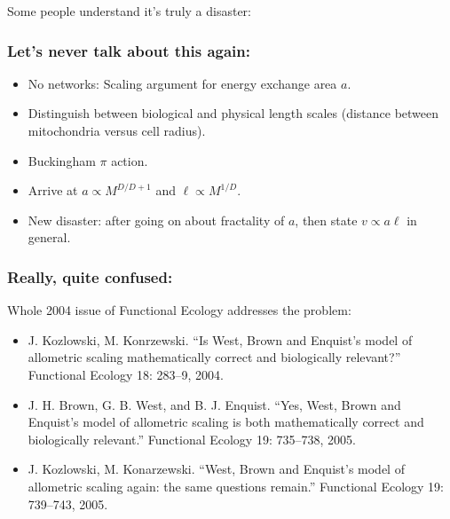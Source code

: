 \begin{frame}
  
  \begin{block}{Some people understand it's truly a disaster:}


    \bigskip

  \end{block}

\end{frame}

\begin{frame}
  \frametitle{Let's never talk about this again:}


  \begin{itemize}
  \item<+-> 
    No networks: Scaling argument for energy exchange area $a$.
  \item<+-> 
    Distinguish between biological and physical length scales
    (distance between mitochondria versus cell radius).
  \item<+-> 
    Buckingham $\pi$ action.~\cite{buckingham1914a}
  \item<+-> 
    Arrive at $a \propto M^{D/D+1}$ and $\ell \propto M^{1/D}$.
  \item<+-> 
    New disaster: after going on about fractality of
    $a$, then state $v \propto a \ell$ in general.
  \end{itemize}
\end{frame}

\begin{frame}
  \frametitle{Really, quite confused:}

  \begin{block}{Whole 2004 issue of Functional Ecology addresses the problem:}
  \begin{itemize}
  \item<+->
     J. Kozlowski, M. Konrzewski. ``Is West, Brown and Enquist's model of allometric scaling mathematically correct and biologically relevant?'' Functional Ecology 18: 283--9, 2004.\cite{kozlowski2004a}
   \item<+->
     J. H. Brown, G. B. West, and B. J. Enquist.
     ``Yes, West, Brown and Enquist's model of allometric scaling is both mathematically correct and biologically relevant.''
     Functional Ecology 19: 735--738, 2005.\cite{brown2005a}
   \item<+->
     J. Kozlowski, M. Konarzewski. ``West, Brown and Enquist's model of allometric scaling again: the same questions remain.'' Functional Ecology 19: 739--743, 2005.
  \end{itemize}
  \end{block}

\end{frame}

